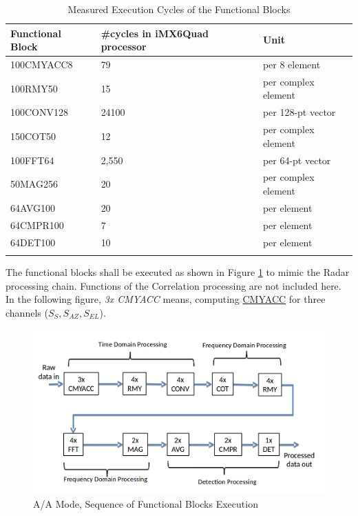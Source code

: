 \begin{longtable}{|l|l|l|}
		\hline
		\textbf{Functional Block} & \textbf{\#cycles in iMX6Quad processor} & \textbf{Unit}  \TBstrut \\ \hline
		100CMYACC8 & 79 & per 8 element \TBstrut \\ \hline
		100RMY50 & 15 & per complex element \TBstrut \\ \hline
		100CONV128 & 24100 & per 128-pt vector \TBstrut \\ \hline
		150COT50 & 12 & per complex element \TBstrut \\ \hline
		100FFT64 & 2,550 & per 64-pt vector \TBstrut \\ \hline
		50MAG256 & 20 & per complex element \TBstrut \\ \hline
		64AVG100 & 20 & per element \TBstrut \\ \hline
		64CMPR100 & 7 & per element \TBstrut \\ \hline
		64DET100 & 10 & per element  \TBstrut \\ \hline
		\caption{Measured Execution Cycles of the Functional Blocks}
		\label{tbl:aa_exe}
\end{longtable}

The functional blocks shall be executed as shown in Figure \ref{fig:bg_related_work:aa_seq} to mimic the Radar processing chain. Functions of the Correlation processing are not included here. In the following figure, \textsl{3x CMYACC} means, computing \hyperlink{benchmarks}{CMYACC} for three channels ($S_{S},S_{AZ},S_{EL}$).

\begin{figure}[h!]
	\centering
	\includegraphics[width=160mm]{figures/aa_seq}
	\caption{A/A Mode, Sequence of Functional Blocks Execution}
	\label{fig:bg_related_work:aa_seq}
\end{figure}

